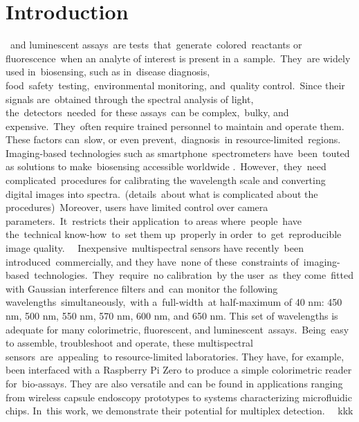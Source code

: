 \documentclass[journal,twoside,web]{ieeecolor}
\begin{document}
\section{Introduction}
\label{sec:introduction}
 and luminescent assays are tests that generate colored reactants or fluorescence when an analyte of interest is present in a sample. They are widely used in biosensing, such as in disease diagnosis, food safety testing, environmental monitoring, and quality control. Since their signals are obtained through the spectral analysis of light, the detectors needed for these assays can be complex, bulky, and expensive. They often require trained personnel to maintain and operate them. These factors can slow, or even prevent, diagnosis in resource-limited regions.  \cite{Wang2020}
Imaging-based technologies such as smartphone spectrometers have been touted as solutions to make biosensing accessible worldwide \cite{Esteve-Turrillas2013}. However, they need complicated procedures for calibrating the wavelength scale and converting digital images into spectra. (details about what is complicated about the procedures) Moreover, users have limited control over camera parameters. It restricts their application to areas where people have the technical know-how to set them up properly in order to get reproducible image quality.  
Inexpensive multispectral sensors have recently been introduced commercially, and they have none of these constraints of imaging-based technologies. They require no calibration by the user as they come fitted with Gaussian interference filters and can monitor the following wavelengths simultaneously, with a full-width at half-maximum of 40 nm: 450 nm, 500 nm, 550 nm, 570 nm, 600 nm, and 650 nm. This set of wavelengths is adequate for many colorimetric, fluorescent, and luminescent assays. Being easy to assemble, troubleshoot and operate, these multispectral sensors are appealing to resource-limited laboratories. They have, for example, been interfaced with a Raspberry Pi Zero to produce a simple colorimetric reader for bio-assays. They are also versatile and can be found in applications ranging from wireless capsule endoscopy prototypes to systems characterizing microfluidic chips. In this work, we demonstrate their potential for multiplex detection. \cite{Wang2020}
 kkk
\end{document}
